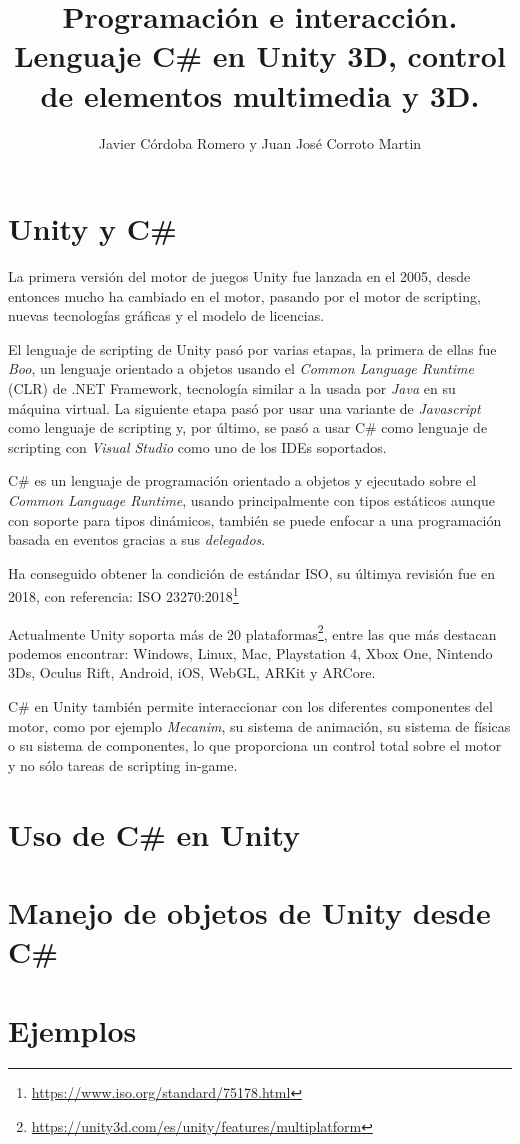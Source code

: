 \documentclass{pre-tfg}
\title{Programación e interacción. Lenguaje C\# en Unity 3D, control de elementos multimedia y 3D.}
\author{Javier Córdoba Romero y Juan José Corroto Martin}
\begin{document}
\maketitle
\tableofcontents

\newpage
\section{Unity y C\#}

La primera versión del motor de juegos Unity fue lanzada en el 2005, desde entonces mucho ha cambiado en el motor, pasando por el motor de scripting, nuevas tecnologías gráficas y el modelo de licencias.

El lenguaje de scripting de Unity pasó por varias etapas, la primera de ellas fue \emph{Boo}, un lenguaje orientado a objetos usando el \emph{Common Language Runtime} (CLR) de .NET Framework, tecnología similar a la usada por \emph{Java} en su máquina virtual. La siguiente etapa pasó por usar una variante de \emph{Javascript} como lenguaje de scripting y, por último, se pasó a usar C\# como lenguaje de scripting con \emph{Visual Studio} como uno de los IDEs soportados.

C\# es un lenguaje de programación orientado a objetos y ejecutado sobre el \emph{Common Language Runtime}, usando principalmente con tipos estáticos aunque con soporte para tipos dinámicos, también se puede enfocar a una programación basada en eventos gracias a sus \emph{delegados}.

Ha conseguido obtener la condición de estándar ISO, su últimya revisión fue en 2018, con referencia: ISO 23270:2018\footnote{\url{https://www.iso.org/standard/75178.html}}

Actualmente Unity soporta más de 20 plataformas\footnote{\url{https://unity3d.com/es/unity/features/multiplatform}}, entre las que más destacan podemos encontrar: Windows, Linux, Mac, Playstation 4, Xbox One, Nintendo 3Ds, Oculus Rift, Android, iOS, WebGL, ARKit y ARCore.

C\# en Unity también permite interaccionar con los diferentes componentes del motor, como por ejemplo \emph{Mecanim}, su sistema de animación, su sistema de físicas o su sistema de componentes, lo que proporciona un control total sobre el motor y no sólo tareas de scripting in-game.

\section{Uso de C\# en Unity}

\section{Manejo de objetos de Unity desde C\#}

\section{Ejemplos}
\end{document}
